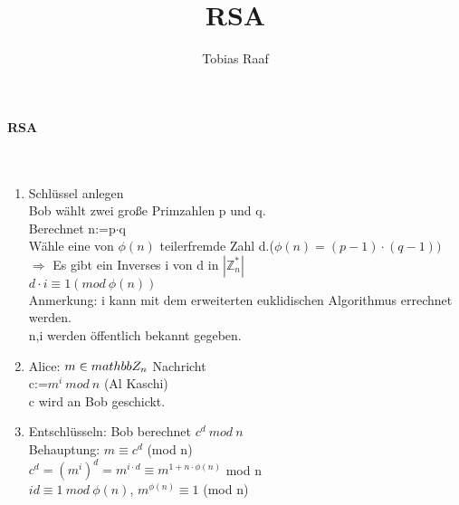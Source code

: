 \documentclass{scrartcl}
\title{RSA}
\author{Tobias Raaf}
\begin{document}
	\large \textbf{RSA}\\\\
	\normalsize\\ \begin{enumerate}
		\item Schlüssel anlegen\\
		Bob wählt zwei große Primzahlen p und q.\\
		Berechnet n:=p$\cdot$q\\
		Wähle eine von $\phi(n)$ teilerfremde Zahl d.($\phi(n)=(p-1)\cdot(q-1))$\\
		$\Rightarrow$ Es gibt ein Inverses i von d in $|\mathbb{Z}_{n}^{*}|$\\
		$d\cdot i\equiv 1 (mod~\phi(n))$\\
		Anmerkung: i kann mit dem erweiterten euklidischen Algorithmus  errechnet werden.\\
		n,i werden öffentlich bekannt gegeben.\\
		\item Alice: $m\in \\mathbb{Z}_n$ Nachricht\\
		c:=$m^{i}~mod~n$ (Al Kaschi)\\
		c wird an Bob geschickt.\\
		\item Entschlüsseln: Bob berechnet $c^{d}~mod~n$\\
		Behauptung: $m\equiv c^d$ (mod n)\\
		$c^d=(m^{i})^{d}=m^{i\cdot d}\equiv m^{1+n\cdot \phi(n)}$ mod n\\
		$id\equiv 1~mod ~ \phi(n)$,  $m^{\phi(n)}\equiv 1$ (mod n)\\
	\end{enumerate}
\end{document}
